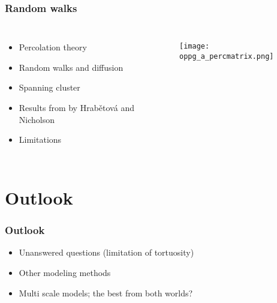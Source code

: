 \documentclass{beamer}
\begin{document}
\begin{frame}
 \frametitle{Random walks}
 \begin{columns}
  \column{2.0in}
  \begin{itemize}
   \item Percolation theory
   \item Random walks and diffusion
   \item Spanning cluster
   \item Results from by Hrab\v{e}tov\'{a} and Nicholson
   \item Limitations
  \end{itemize}
\column{2.0in}
\begin{figure}[H]
\centering
\texttt{[image: oppg\_a\_percmatrix.png]}
 \end{figure}

 \end{columns}
\end{frame}

\section{Outlook}
\begin{frame}
 \frametitle{Outlook}
  \begin{itemize}
   \item Unanswered questions (limitation of tortuosity)
   \item Other modeling methods
   \item Multi scale models; the best from both worlds?
  \end{itemize}
% 
\end{frame}

\begin{frame}
\end{frame}
\end{document}
